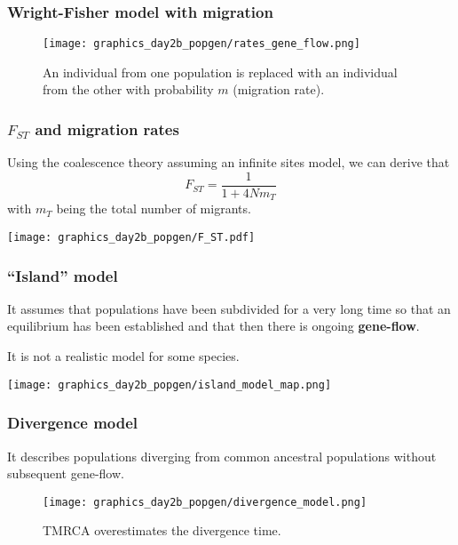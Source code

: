 \documentclass{beamer}
\newcommand{\1}{\ensuremath{\mathbf{1}}}
\begin{document}
%
%
%
\begin{frame}\frametitle{Wright-Fisher model with migration}
	\begin{figure}
	\begin{center}
		\texttt{[image: graphics\_day2b\_popgen/rates\_gene\_flow.png]}
	\end{center}
	\caption{An individual from one population is replaced with an individual from the other with probability $m$ (migration rate).}
	\end{figure}
\end{frame}
%
%
%
\begin{frame}\frametitle{$F_{ST}$ and migration rates}
	Using the coalescence theory assuming an infinite sites model, we can derive that
	\begin{equation}
		F_{ST} = \frac{1}{1 + 4Nm_T}
	\end{equation}
	with $m_T$ being the total number of migrants.
	\begin{center}
		\texttt{[image: graphics\_day2b\_popgen/F\_ST.pdf]}
	\end{center}
\end{frame}
%
%
%
\begin{frame}\frametitle{``Island'' model}
	\begin{block}{}
		It assumes that populations have been subdivided for a very long time so that an equilibrium has been established and that then there is ongoing \textbf{gene-flow}.
	\end{block}
	It is not a realistic model for some species.
	\begin{center}
		\texttt{[image: graphics\_day2b\_popgen/island\_model\_map.png]}
	\end{center}
\end{frame}
%
%
%
\begin{frame}\frametitle{Divergence model}
	\begin{block}{}
		It describes populations diverging from common ancestral populations without subsequent gene-flow.
	\end{block}
	\begin{figure}
	\begin{center}
		\texttt{[image: graphics\_day2b\_popgen/divergence\_model.png]}
	\end{center}
	\caption{TMRCA overestimates the divergence time.}
	\end{figure}
\end{frame}
\end{document}
